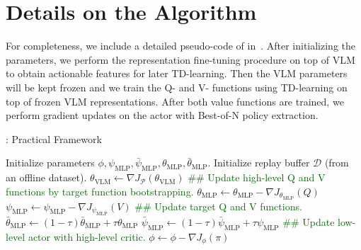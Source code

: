 \section{Details on the Algorithm} \label{app:algorithm}

For completeness, we include a detailed pseudo-code of \ourmethod{} in~. After initializing the parameters, we perform the representation fine-tuning procedure on top of VLM to obtain actionable features for later TD-learning. Then the VLM parameters will be kept frozen and we train the Q- and V- functions using TD-learning on top of frozen VLM representations. After both value functions are trained, we perform gradient updates on the actor with Best-of-N policy extraction.

\begin{algorithm}[!htp]
\caption{\ourmethod{}: Practical Framework}
\label{alg:archer_detail}
\begin{algorithmic}[1]
\State Initialize parameters $\phi, \psi_\mathrm{MLP}, \bar{\psi}_\mathrm{MLP}, \theta_\mathrm{MLP}, \bar{\theta}_\mathrm{MLP}$.
\State Initialize replay buffer $\mathcal{D}$ (from an offline dataset).
\State $\theta_\mathrm{VLM} \leftarrow \nabla J_\mathcal P(\theta_\mathrm{VLM})$
\EndFor
{}
\State \textcolor{darkgreen}{\#\# Update high-level Q and V functions by target function bootstrapping.}
\State $\theta_\mathrm{MLP} \leftarrow \theta_\mathrm{MLP} - \nabla J_{\theta_\mathrm{MLP}}(Q)$ 
\State $\psi_\mathrm{MLP} \leftarrow \psi_\mathrm{MLP} - \nabla J_{\psi_\mathrm{MLP}}(V)$ 
\State \textcolor{darkgreen}{\#\# Update target Q and V functions.}
\State $\bar{\theta}_\mathrm{MLP} \leftarrow (1 - \tau)\bar{\theta}_\mathrm{MLP} + \tau\theta_\mathrm{MLP}$
\State $\bar{\psi}_\mathrm{MLP} \leftarrow (1 - \tau)\bar{\psi}_\mathrm{MLP} + \tau\psi_\mathrm{MLP}$
\EndFor
\State \textcolor{darkgreen}{\#\# Update low-level actor with high-level critic.}
\State $\phi \leftarrow \phi - \nabla J_\phi(\pi)$ 
\EndFor
\end{algorithmic}
\end{algorithm}
